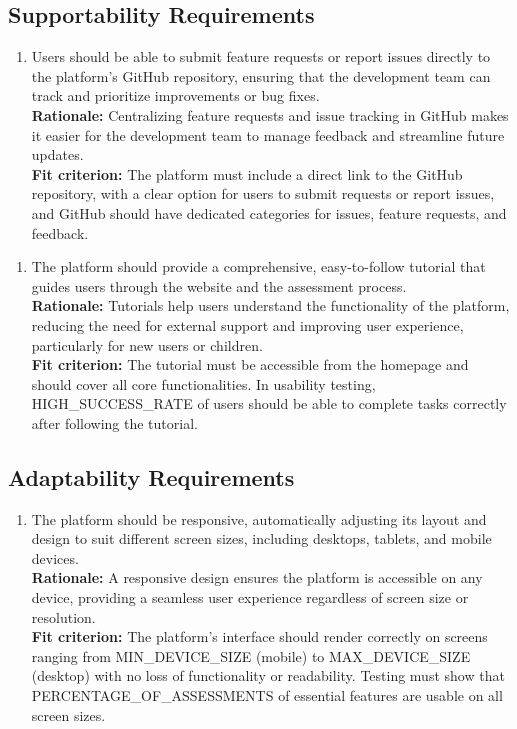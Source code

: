 \documentclass[12pt]{article}
\begin{document}
\subsection{Supportability Requirements}
\begin{enumerate}[label={MS-SR}1. ]
  \item Users should be able to submit feature requests or report issues directly to the platform’s GitHub repository, ensuring that the development team can track and prioritize improvements or bug fixes.\\
  \textbf{Rationale: }Centralizing feature requests and issue tracking in GitHub makes it easier for the development team to manage feedback and streamline future updates.\\
  \textbf{Fit criterion: }The platform must include a direct link to the GitHub repository, with a clear option for users to submit requests or report issues, and GitHub should have dedicated categories for issues, 
  feature requests, and feedback.
\end{enumerate}
\begin{enumerate}[label={MS-SR}2. ]
  \item The platform should provide a comprehensive, easy-to-follow tutorial that guides users through the website and the assessment process.\\
  \textbf{Rationale: }Tutorials help users understand the functionality of the platform, reducing the need for external support and improving user experience, particularly for new users or children.\\
  \textbf{Fit criterion: }The tutorial must be accessible from the homepage and should cover all core functionalities. In usability testing,\\ HIGH\_SUCCESS\_RATE of users should be able to complete tasks correctly after following the
   tutorial.
\end{enumerate}

\subsection{Adaptability Requirements}
\begin{enumerate}[label={MS-AR}1. ]
  \item The platform should be responsive, automatically adjusting its layout and design to suit different screen sizes, including desktops, tablets, and mobile devices.\\
  \textbf{Rationale: }A responsive design ensures the platform is accessible on any device, providing a seamless user experience regardless of screen size or resolution.\\
  \textbf{Fit criterion: }The platform’s interface should render correctly on screens ranging from MIN\_DEVICE\_SIZE (mobile) to MAX\_DEVICE\_SIZE (desktop) with no loss of functionality or readability. Testing must show that\\ PERCENTAGE\_OF\_ASSESSMENTS of essential 
  features are usable on all screen sizes.
\end{enumerate}
\end{document}
